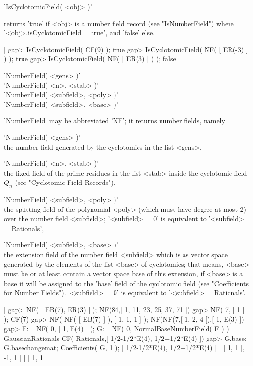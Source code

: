 
'IsCyclotomicField( <obj> )'

returns 'true' if <obj> is a number field record (see "IsNumberField")
where '<obj>.isCyclotomicField = true', and 'false' else.

|    gap> IsCyclotomicField( CF(9) );
    true
    gap> IsCyclotomicField( NF( [ ER(-3) ] ) );
    true
    gap> IsCyclotomicField( NF( [ ER(3) ] ) );
    false|


'NumberField( <gens> )'\\
'NumberField( <n>, <stab> )'\\
'NumberField( <subfield>, <poly> )'\\
'NumberField( <subfield>, <base> )'

'NumberField' may be abbreviated 'NF'; it returns number fields, namely

'NumberField( <gens> )'\:\\
     the number field generated by the cyclotomics in the list <gens>,

'NumberField( <n>, <stab> )'\:\\
     the fixed field of the prime residues in the list <stab> inside the
     cyclotomic field $Q_n$ (see "Cyclotomic Field Records"),

'NumberField( <subfield>, <poly> )'\:\\
     the splitting field of the polynomial <poly> (which must have degree
     at most 2) over the number field <subfield>; '<subfield> = 0'
     is equivalent to '<subfield> = Rationals',

'NumberField( <subfield>, <base> )'\:\\
     the extension field of the number field <subfield> which is
     as vector space generated by the elements of the list <base> of
     cyclotomics; that means, <base> must be or at least contain a vector
     space base of this extension, if <base> is a base it will be
     assigned to the 'base' field of the cyclotomic field
     (see "Coefficients for Number Fields").
     '<subfield> = 0' is equivalent to '<subfield> = Rationals'.

|    gap> NF( [ EB(7), ER(3) ] );
    NF(84,[ 1, 11, 23, 25, 37, 71 ])
    gap> NF( 7, [ 1 ] );
    CF(7)
    gap> NF( NF( [ EB(7) ] ), [ 1, 1, 1 ] );
    NF(NF(7,[ 1, 2, 4 ]),[ 1, E(3) ])
    gap> F:= NF( 0, [ 1, E(4) ] ); G:= NF( 0, NormalBaseNumberField( F ) );
    GaussianRationals
    CF( Rationals,[ 1/2-1/2*E(4), 1/2+1/2*E(4) ])
    gap> G.base; G.basechangemat; Coefficients( G, 1 );
    [ 1/2-1/2*E(4), 1/2+1/2*E(4) ]
    [ [ 1, 1 ], [ -1, 1 ] ]
    [ 1, 1 ]|

